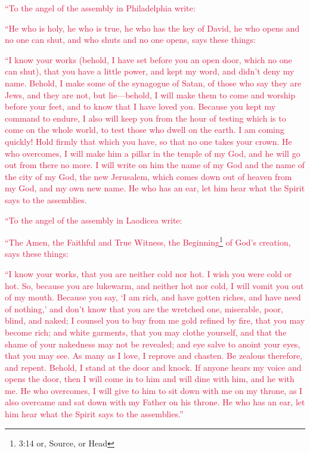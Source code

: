 \myverse{}\textcolor{crimson}{“To the angel of the assembly in Philadelphia write:}

\textcolor{crimson}{“He who is holy, he who is true, he who has the key of David, he who opens and no one
	can shut, and who shuts and no one opens, says these things:
}

\myverse{}\textcolor{crimson}{“I know your works (behold, I have set before you an open door,
	which no one can shut), that you have a little power, and kept my word, and didn’t deny my name.
}
\myverse{}\textcolor{crimson}{Behold, I make some of the synagogue of Satan, of those who say they are
	Jews, and they are not, but lie—behold, I will make them to come and worship before your feet, and to
	know that I have loved you.
}
\myverse{}\textcolor{crimson}{Because you kept my command to endure, I also will keep you from the hour
	of testing which is to come on the whole world, to test those who dwell on the earth.
}
\myverse{}\textcolor{crimson}{I am coming quickly! Hold firmly that which you have, so that no one takes
	your crown.
}
\myverse{}\textcolor{crimson}{He who overcomes, I will make him a pillar in the temple of my God, and
	he will go out from there no more. I will write on him the name of my God and the name of the city of
	my God, the new Jerusalem, which comes down out of heaven from my God, and my own new name.
}
\myverse{}\textcolor{crimson}{He who has an ear, let him hear what the Spirit says to the assemblies.}

\myverse{}\textcolor{crimson}{“To the angel of the assembly in Laodicea write:}

\textcolor{crimson}{“The Amen, the Faithful and True Witness, the Beginning}\footnote{3:14 or, Source, or Head}
\textcolor{crimson}{of God’s creation, says these things:}

\myverse{}\textcolor{crimson}{“I know your works, that you are neither cold nor hot. I
	wish you were cold or hot.
}
\myverse{}\textcolor{crimson}{So, because you are lukewarm, and neither hot nor cold, I will vomit you
	out of my mouth.
}
\myverse{}\textcolor{crimson}{Because you say, ‘I am rich, and have gotten riches, and have need of
	nothing,’ and don’t know that you are the wretched one, miserable, poor, blind, and naked;
}
\myverse{}\textcolor{crimson}{I counsel you to buy from me gold refined by fire, that you may become
	rich; and white garments, that you may clothe yourself, and that the shame of your nakedness may not be
	revealed; and eye salve to anoint your eyes, that you may see.
}
\myverse{}\textcolor{crimson}{As many as I love, I reprove and chasten. Be zealous therefore, and repent.
}
\myverse{}\textcolor{crimson}{Behold, I stand at the door and knock. If anyone hears my voice and opens
	the door, then I will come in to him and will dine with him, and he with me.
}
\myverse{}\textcolor{crimson}{He who overcomes, I will give to him to sit down with me on my throne,
	as I also overcame and sat down with my Father on his throne.
}
\myverse{}\textcolor{crimson}{He who has an ear, let him hear what the Spirit says to the assemblies.”}

